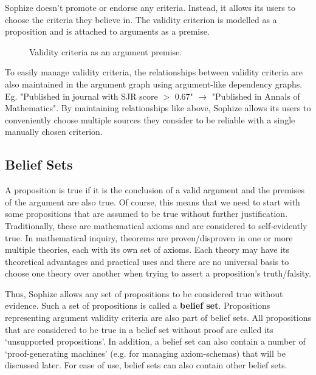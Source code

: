 \documentclass[a4paper]{article}
\begin{document}
Sophize doesn't promote or endorse any criteria. Instead, it allows its users to choose the criteria they believe in. The validity criterion is modelled as a proposition and is attached to arguments as a premise. 

\begin{figure}[htbp]
\begin{center}
\caption{Validity criteria as an argument premise.}
\label{validity_criterion}
\end{center}
\end{figure}

To easily manage validity criteria, the relationships between validity criteria are also maintained in the argument graph using argument-like dependency graphs. Eg. "Published in journal with SJR score $>$ 0.67" $\rightarrow$ "Published in Annals of Mathematics". By maintaining relationships like above, Sophize allows its users to conveniently choose multiple sources they consider to be reliable with a single manually chosen criterion. 

\subsection{Belief Sets}
\label{sec:bset}

A proposition is true if it is the conclusion of a valid argument and the premises of the argument are also true. Of course, this means that we need to start with some propositions that are assumed to be true without further justification. Traditionally, these are mathematical axioms and are considered to self-evidently true. In mathematical inquiry, theorems are proven/disproven in one or more multiple theories, each with its own set of axioms. Each theory may have its theoretical advantages and practical uses and there are no universal basis to choose one theory over another when trying to assert a proposition's truth/falsity.

Thus, Sophize allows any set of propositions to be considered true without evidence. Such a set of propositions is called a \textbf{belief set}. Propositions representing argument validity criteria are also part of belief sets. All propositions that are considered to be true in a belief set without proof are called its `unsupported propositions'. In addition, a belief set can also contain a number of `proof-generating machines' (e.g. for managing axiom-schemas) that will be discussed later. For ease of use, belief sets can also contain other belief sets.
\end{document}
